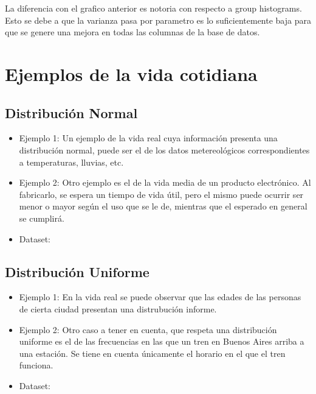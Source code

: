 \documentclass[10pt, a4paper,english,spanish,hidelinks]{article}
\begin{document}
La diferencia con el grafico anterior es notoria con respecto a group histograms. Esto se debe a que la varianza pasa por parametro es lo suficientemente baja para que se genere una mejora en todas las columnas de la base de datos. 


\section{Ejemplos de la vida cotidiana}

\subsection{Distribución Normal}
\begin{itemize}
\item Ejemplo 1: Un ejemplo de la vida real cuya información presenta una distribución normal, puede ser el de los datos metereológicos correspondientes a temperaturas, lluvias, etc. 

\item Ejemplo 2: Otro ejemplo es el de la vida media de un producto electrónico. Al fabricarlo, se espera un tiempo de vida útil, pero el mismo puede ocurrir ser menor o mayor según el uso que se le de, mientras que el esperado en general se cumplirá. 

\item Dataset:

\end{itemize}

\subsection{Distribución Uniforme}
\begin{itemize}
\item Ejemplo 1: En la vida real se puede observar que las edades de las personas de cierta ciudad presentan una distrubución informe. 

\item Ejemplo 2: Otro caso a tener en cuenta, que respeta una distribución uniforme es el de las frecuencias en las que un tren en Buenos Aires arriba a una estación. Se tiene en cuenta únicamente el horario en el que el tren funciona. 

\item Dataset:

\end{itemize}
\end{document}
